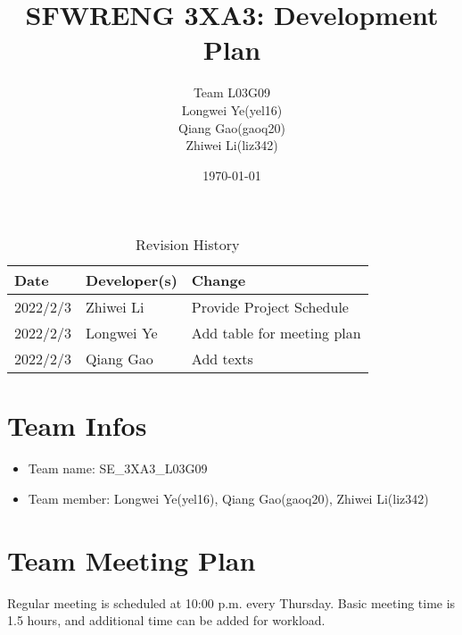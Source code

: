 \documentclass[11pt, letterpaper]{article}
\title{SFWRENG 3XA3: Development Plan}
\author{Team L03G09 \\
		Longwei Ye(yel16) \\
		Qiang Gao(gaoq20) \\
		Zhiwei Li(liz342) \\}
\date{\today}
\begin{document}
\begin{titlepage}
\maketitle
\end{titlepage}

\begin{table}[hp]
	\caption{Revision History} \label{TblRevisionHistory}
	\begin{tabularx}{\textwidth}{llX}
	\toprule
	\textbf{Date} & \textbf{Developer(s)} & \textbf{Change}\\
	\midrule
	2022/2/3 & Zhiwei Li & Provide Project Schedule\\
	2022/2/3 & Longwei Ye & Add table for meeting plan\\
	2022/2/3 & Qiang Gao & Add texts\\
	\bottomrule
	\end{tabularx}
\end{table}
	
\section{Team Infos}
\begin{itemize}
	\item Team name: SE\_3XA3\_L03G09
	\item Team member: Longwei Ye(yel16), Qiang Gao(gaoq20), Zhiwei Li(liz342)
\end{itemize}
\section{Team Meeting Plan}
Regular meeting is scheduled at 10:00 p.m. every Thursday. Basic meeting time is 1.5 hours, 
and additional time can be added for workload.
\end{document}
